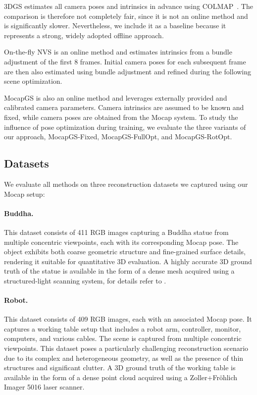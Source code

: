 \documentclass[a4paper,fleqn]{cas-dc}
\begin{document}
3DGS estimates all camera poses and intrinsics in advance using COLMAP~\cite{schonberger_pixelwise_2016}. The comparison is therefore not completely fair, since it is not an online method and is significantly slower. Nevertheless, we include it as a baseline because it represents a strong, widely adopted offline approach.

On-the-fly NVS is an online method and estimates intrinsics from a bundle adjustment of the first 8 frames. Initial camera poses for each subsequent frame are then also estimated using bundle adjustment and refined during the following scene optimization.

MocapGS is also an online method and leverages externally provided and calibrated camera parameters. Camera intrinsics are assumed to be known and fixed, while camera poses are obtained from the Mocap system. To study the influence of pose optimization during training, we evaluate the three variants of our approach, MocapGS-Fixed, MocapGS-FullOpt, and MocapGS-RotOpt.

\subsection{Datasets}
We evaluate all methods on three reconstruction datasets we captured using our Mocap setup:
\paragraph{Buddha.}
This dataset consists of 411 RGB images capturing a Buddha statue from multiple concentric viewpoints, each with its corresponding Mocap pose. The object exhibits both coarse geometric structure and fine-grained surface details, rendering it suitable for quantitative 3D evaluation. A highly accurate 3D ground truth of the statue is available in the form of a dense mesh acquired using a structured-light scanning system, for details refer to \cite{petrovska_geometric_2023, petrovska_vision_2024}.

\paragraph{Robot.} 
This dataset consists of 409 RGB images, each with an associated Mocap pose. It captures a working table setup that includes a robot arm, controller, monitor, computers, and various cables. The scene is captured from multiple concentric viewpoints. This dataset poses a particularly challenging reconstruction scenario due to its complex and heterogeneous geometry, as well as the presence of thin structures and significant clutter. A 3D ground truth of the working table is available in the form of a dense point cloud acquired using a Zoller+Fröhlich Imager 5016 laser scanner.
\end{document}
